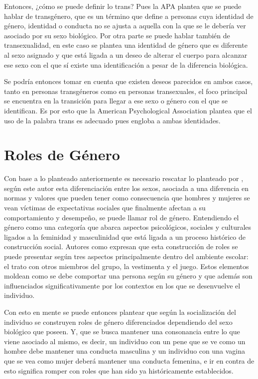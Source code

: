 Entonces, ¿cómo se puede definir lo trans? Pues la APA \parencite{APA} plantea
que se puede hablar de transgénero, que es un término que define a personas cuya
identidad de género, identidad o conducta no se ajusta a aquella con la que se
le debería ver asociado por su sexo biológico. Por otra parte se puede hablar
también de transexualidad, en este caso se plantea una identidad de género que
es diferente al sexo asignado y que está ligada a un deseo de alterar el cuerpo
para alcanzar ese sexo con el que sí existe una identificación a pesar de la
diferencia biológica.

Se podría entonces tomar en cuenta que existen deseos parecidos en ambos casos,
tanto en personas transgéneros como en personas transexuales, el foco principal
se encuentra en la transición para llegar a ese sexo o género con el que se
identifican. Es por esto que la American Psychological Association plantea que
el uso de la palabra trans es adecuado pues engloba a ambas identidades.


\section{Roles de Género}

Con base a lo planteado anteriormente es necesario rescatar lo planteado por \textcite{Herrera2000}, según
este autor esta diferenciación entre los sexos, asociada a una diferencia
en normas y valores que pueden tener como consecuencia que
hombres y mujeres se vean víctimas de expectativas sociales que finalmente
afectan a su comportamiento y desempeño, se puede llamar rol de género.
Entendiendo el género como una categoría que abarca aspectos psicológicos,
sociales y culturales ligados a la feminidad y masculinidad que está ligada a
un proceso histórico de construcción social.  Autores como
\textcite{Gonzalez2013} expresan que esta construcción de roles se puede
presentar según tres aspectos principalmente dentro del ambiente escolar: el
trato con otros miembros del grupo, la vestimenta y el juego. Estos elementos
moldean como se debe comportar una persona según su género y que además son
influenciados significativamente por los contextos en los que se desenvuelve el
individuo.

Con esto en mente se puede entonces plantear que según la socialización del
individuo se construyen roles de género diferenciados dependiendo del sexo biológico que
poseen. Y, que se busca mantener una consonancia entre lo que viene asociado al
mismo, es decir, un individuo con un pene que se ve como un hombre debe mantener
una conducta masculina y un individuo con una vagina que se vea como mujer
deberá mantener una conducta femenina, e ir en contra de esto significa romper
con roles que han sido ya históricamente establecidos.

